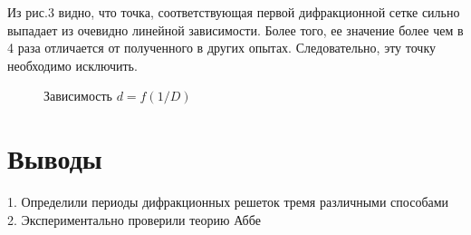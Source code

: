 \documentclass[a4paper,12pt]{article}
\begin{document}
Из рис.3 видно, что точка, соответствующая первой дифракционной сетке сильно выпадает из очевидно линейной зависимости. Более того, ее значение более чем в 4 раза отличается от полученного в других опытах. Следовательно, эту точку необходимо исключить. 

	\begin{figure}[h!]
		\caption{Зависимость $d = f(1/D)$ }
		\label{fig:graph2}
	\end{figure}  

\section*{Выводы}
1. Определили периоды дифракционных решеток тремя различными способами \\
2. Экспериментально проверили теорию Аббе
\end{document}
